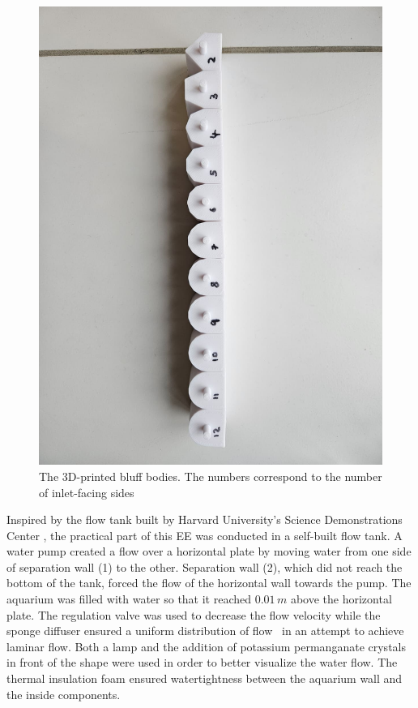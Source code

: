 \begin{figure}[H]
	\centering
	\includegraphics[width=\textwidth]{images/shapes.jpg}
	\caption{The 3D-printed bluff bodies. The numbers correspond to the number of inlet-facing sides}
	\label{fig:shapes}
\end{figure}

\newpage

Inspired by the flow tank built by Harvard University’s Science Demonstrations Center \parencite{noauthor_vortex_nodate}, the practical part of this EE was conducted in a self-built flow tank. A water pump created a flow over a horizontal plate by moving water from one side of separation wall (1) to the other. Separation wall (2), which did not reach the bottom of the tank, forced the flow of the horizontal wall towards the pump. The aquarium was filled with water so that it reached $0.01\,m$ above the horizontal plate. The regulation valve was used to decrease the flow velocity while the sponge diffuser ensured a uniform distribution of flow \textemdash\ in an attempt to achieve laminar flow. Both a lamp and the addition of potassium permanganate crystals in front of the shape were used in order to better visualize the water flow. The thermal insulation foam ensured watertightness between the aquarium wall and the inside components. 

